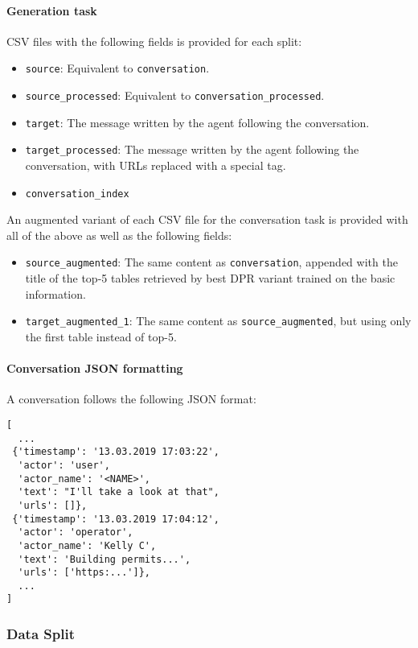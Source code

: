 \documentclass[11pt]{article}
\begin{document}
\paragraph{Generation task} CSV files with the following fields is provided for each split:
\begin{itemize}
    \item \verb|source|: Equivalent to \verb|conversation|.
    \item \verb|source_processed|: Equivalent to \verb|conversation_processed|.
    \item \verb|target|: The message written by the agent following the conversation.
    \item \verb|target_processed|: The message written by the agent following the conversation, with URLs replaced with a special tag.
    \item \verb|conversation_index|
\end{itemize}

An augmented variant of each CSV file for the conversation task is provided with all of the above as well as the following fields:
\begin{itemize}
    \item \verb|source_augmented|: The same content as \verb|conversation|, appended with the title of the top-5 tables retrieved by best DPR variant trained on the basic information.
    \item \verb|target_augmented_1|: The same content as \verb|source_augmented|, but using only the first table instead of top-5.
\end{itemize}

\paragraph{Conversation JSON formatting}
A conversation follows the following JSON format:

\begin{small}
\begin{verbatim}
[
  ...
 {'timestamp': '13.03.2019 17:03:22',
  'actor': 'user',
  'actor_name': '<NAME>',
  'text': "I'll take a look at that",
  'urls': []},
 {'timestamp': '13.03.2019 17:04:12',
  'actor': 'operator',
  'actor_name': 'Kelly C',
  'text': 'Building permits...',
  'urls': ['https:...']},
  ...
]
\end{verbatim}
\end{small}

\subsubsection{Data Split}
\end{document}
